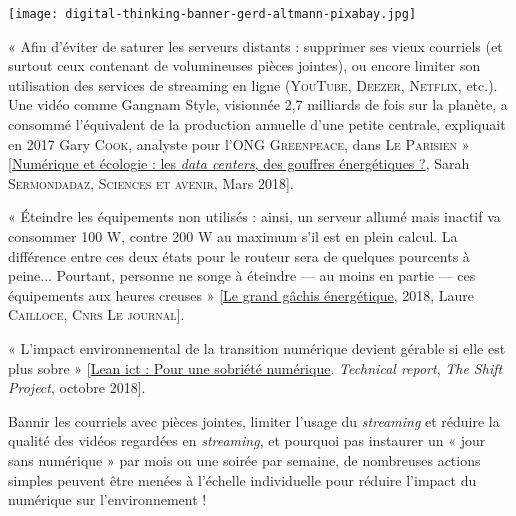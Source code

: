 \begin{jazzgraphic*}
\Centering
\texttt{[image: digital-thinking-banner-gerd-altmann-pixabay.jpg]}
\end{jazzgraphic*}

« Afin d'éviter de saturer les serveurs distants : supprimer ses vieux courriels (et surtout ceux contenant de volumineuses pièces jointes), ou encore limiter son utilisation des services de streaming en ligne (\textsc{YouTube}, \textsc{Deezer}, \textsc{Netflix}, etc.). Une vidéo comme Gangnam Style, visionnée 2,7 milliards de fois sur la planète, a consommé l'équivalent de la production annuelle d'une petite centrale, expliquait en 2017 Gary \textsc{Cook}, analyste pour l'ONG \textsc{Greenpeace}, dans \textsc{Le Parisien} » [\href{https://www.sciencesetavenir.fr/high-tech/informatique/numerique-et-ecologie-les-data-centers-des-gouffres-energetiques_121838}{Numérique et écologie : les \textit{data centers}, des gouffres énergétiques ?}, Sarah \textsc{Sermondadaz}, \textsc{Sciences et avenir}, Mars 2018].


« Éteindre les équipements non utilisés : ainsi, un serveur allumé mais inactif va consommer 100 W, contre 200 W au maximum s’il est en plein calcul. La différence entre ces deux états pour le routeur sera de quelques pourcents à peine... Pourtant, personne ne songe à éteindre --- au moins en partie --- ces équipements aux heures creuses » [\href{https://lejournal.cnrs.fr/articles/numerique-le-grand-gachis-energetique}{Le grand gâchis énergétique}, 2018, Laure \textsc{Cailloce}, \textsc{Cnrs Le journal}].

« L’impact environnemental de la transition numérique devient gérable si elle est plus sobre » [\href{https://theshiftproject.org/article/pour-une-sobriete-numerique-rapport-shift/}{Lean ict : Pour une sobriété numérique}. \textit{Technical report}, \textit{The Shift Project}, octobre 2018].

Bannir les courriels avec pièces jointes, limiter l'usage du \textit{streaming} et réduire la qualité des vidéos regardées en \textit{streaming}, et pourquoi pas instaurer un « jour sans numérique » par mois ou une soirée par semaine, de nombreuses actions simples peuvent être menées à l'échelle individuelle pour réduire l'impact du numérique sur l'environnement !


